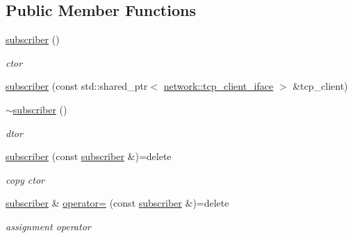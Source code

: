\subsection*{Public Member Functions}
\begin{DoxyCompactItemize}
\item 
\mbox{\label{classcpp__redis_1_1subscriber_a7a6cf12c6f12fbc54cd80ceaf7ac4cba}} 
\mbox{\hyperlink{classcpp__redis_1_1subscriber_a7a6cf12c6f12fbc54cd80ceaf7ac4cba}{subscriber}} ()
\begin{DoxyCompactList}\small\item\em ctor \end{DoxyCompactList}\item 
\mbox{\hyperlink{classcpp__redis_1_1subscriber_a66136601f44564842e2c67de2da199af}{subscriber}} (const std\+::shared\+\_\+ptr$<$ \mbox{\hyperlink{classcpp__redis_1_1network_1_1tcp__client__iface}{network\+::tcp\+\_\+client\+\_\+iface}} $>$ \&tcp\+\_\+client)
\item 
\mbox{\label{classcpp__redis_1_1subscriber_a24e54cbec0cc6dcae663cf9399740fe7}} 
\mbox{\hyperlink{classcpp__redis_1_1subscriber_a24e54cbec0cc6dcae663cf9399740fe7}{$\sim$subscriber}} ()
\begin{DoxyCompactList}\small\item\em dtor \end{DoxyCompactList}\item 
\mbox{\label{classcpp__redis_1_1subscriber_af5f11532bf727eeb2d4a926bdc775cd7}} 
\mbox{\hyperlink{classcpp__redis_1_1subscriber_af5f11532bf727eeb2d4a926bdc775cd7}{subscriber}} (const \mbox{\hyperlink{classcpp__redis_1_1subscriber}{subscriber}} \&)=delete
\begin{DoxyCompactList}\small\item\em copy ctor \end{DoxyCompactList}\item 
\mbox{\label{classcpp__redis_1_1subscriber_ac60f83e6e915073bda6853baaeb39485}} 
\mbox{\hyperlink{classcpp__redis_1_1subscriber}{subscriber}} \& \mbox{\hyperlink{classcpp__redis_1_1subscriber_ac60f83e6e915073bda6853baaeb39485}{operator=}} (const \mbox{\hyperlink{classcpp__redis_1_1subscriber}{subscriber}} \&)=delete
\begin{DoxyCompactList}\small\item\em assignment operator \end{DoxyCompactList}\item 

\end{DoxyCompactItemize}
